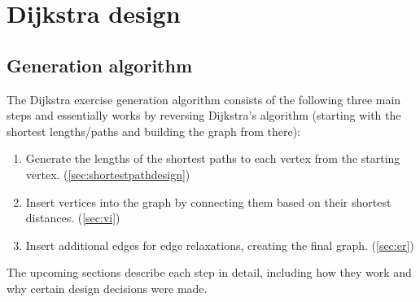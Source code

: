 \documentclass{l4proj}
\begin{document}

\chapter{Dijkstra design}

\section{Generation algorithm}
\label{sec:dgen}

The Dijkstra exercise generation algorithm consists of the following three main steps and essentially works by reversing Dijkstra's algorithm (starting with the shortest lengths/paths and building the graph from there):

\begin{enumerate}
	\item
	Generate the lengths of the shortest paths to each vertex from the starting vertex. (\autoref{sec:shortestpathdesign})
	\item
	Insert vertices into the graph by connecting them based on their shortest distances. (\autoref{sec:vi})
	\item
	Insert additional edges for edge relaxations, creating the final graph. (\autoref{sec:er})
\end{enumerate}

The upcoming sections describe each step in detail, including how they work and why certain design decisions were made. 
\end{document}
